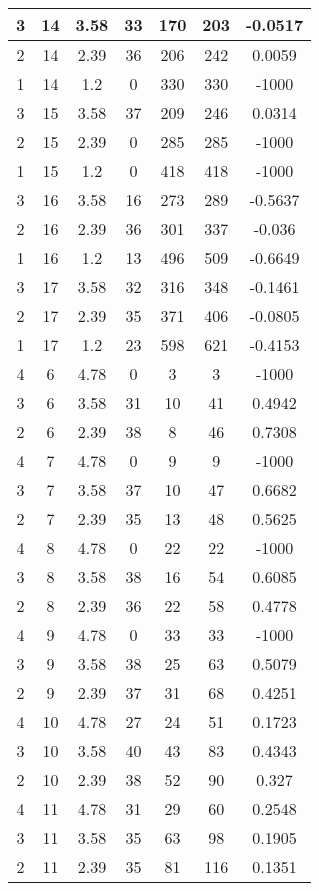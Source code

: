 \documentclass[letterpaper, 12pt]{article}
\begin{document}
\begin{longtable}{|c|c|c|c|c|c|c|}
\hline
3 & 14 & 3.58 & 33 & 170 & 203 & -0.0517 \\
\hline
2 & 14 & 2.39 & 36 & 206 & 242 & 0.0059 \\
\hline
1 & 14 & 1.2 & 0 & 330 & 330 & -1000 \\
\hline
3 & 15 & 3.58 & 37 & 209 & 246 & 0.0314 \\
\hline
2 & 15 & 2.39 & 0 & 285 & 285 & -1000 \\
\hline
1 & 15 & 1.2 & 0 & 418 & 418 & -1000 \\
\hline
3 & 16 & 3.58 & 16 & 273 & 289 & -0.5637 \\
\hline
2 & 16 & 2.39 & 36 & 301 & 337 & -0.036 \\
\hline
1 & 16 & 1.2 & 13 & 496 & 509 & -0.6649 \\
\hline
3 & 17 & 3.58 & 32 & 316 & 348 & -0.1461 \\
\hline
2 & 17 & 2.39 & 35 & 371 & 406 & -0.0805 \\
\hline
1 & 17 & 1.2 & 23 & 598 & 621 & -0.4153 \\
\hline
4 & 6 & 4.78 & 0 & 3 & 3 & -1000 \\
\hline
3 & 6 & 3.58 & 31 & 10 & 41 & 0.4942 \\
\hline
2 & 6 & 2.39 & 38 & 8 & 46 & 0.7308 \\
\hline
4 & 7 & 4.78 & 0 & 9 & 9 & -1000 \\
\hline
3 & 7 & 3.58 & 37 & 10 & 47 & 0.6682 \\
\hline
2 & 7 & 2.39 & 35 & 13 & 48 & 0.5625 \\
\hline
4 & 8 & 4.78 & 0 & 22 & 22 & -1000 \\
\hline
3 & 8 & 3.58 & 38 & 16 & 54 & 0.6085 \\
\hline
2 & 8 & 2.39 & 36 & 22 & 58 & 0.4778 \\
\hline
4 & 9 & 4.78 & 0 & 33 & 33 & -1000 \\
\hline
3 & 9 & 3.58 & 38 & 25 & 63 & 0.5079 \\
\hline
2 & 9 & 2.39 & 37 & 31 & 68 & 0.4251 \\
\hline
4 & 10 & 4.78 & 27 & 24 & 51 & 0.1723 \\
\hline
3 & 10 & 3.58 & 40 & 43 & 83 & 0.4343 \\
\hline
2 & 10 & 2.39 & 38 & 52 & 90 & 0.327 \\
\hline
4 & 11 & 4.78 & 31 & 29 & 60 & 0.2548 \\
\hline
3 & 11 & 3.58 & 35 & 63 & 98 & 0.1905 \\
\hline
2 & 11 & 2.39 & 35 & 81 & 116 & 0.1351 \\

\end{longtable}
\end{document}
